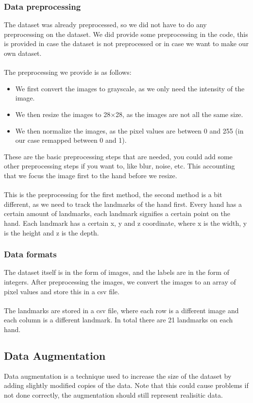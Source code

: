 \documentclass[../paper.tex]{subfiles}
\begin{document}
    \subsubsection{Data preprocessing}
    The dataset was already preprocessed, so we did not have to do any preprocessing on the dataset. 
    We did provide some preprocessing in the code, this is provided in case the dataset is not preprocessed or in case we want to make our own dataset.\\
    \\
    The preprocessing we provide is as follows:
    \begin{itemize}
        \item We first convert the images to grayscale, as we only need the intensity of the image.
        \item We then resize the images to 28$\times$28, as the images are not all the same size.
        \item We then normalize the images, as the pixel values are between 0 and 255 (in our case remapped between 0 and 1).
    \end{itemize}
    These are the basic preprocessing steps that are needed, you could add some other preprocessing steps if you want to, like blur, noise, etc.
    This accounting that we focus the image first to the hand before we resize.
    \\\\
    This is the preprocessing for the first method, the second method is a bit different, as we need to track the landmarks of the hand first.
    Every hand has a certain amount of landmarks, each landmark signifies a certain point on the hand.
    Each landmark has a certain x, y and z coordinate, where x is the width, y is the height and z is the depth.

    \subsubsection{Data formats}
    The dataset itself is in the form of images, and the labels are in the form of integers. 
    After preprocessing the images, we convert the images to an array of pixel values and store this in a csv file.
    \\\\
    The landmarks are stored in a csv file, where each row is a different image and each column is a different landmark.
    In total there are 21 landmarks on each hand.

    \subsection{Data Augmentation}
    Data augmentation is a technique used to increase the size of the dataset by adding slightly modified copies of the data.
    Note that this could cause problems if not done correctly, the augmentation should still represent realisitic data.
    
    
\end{document}
